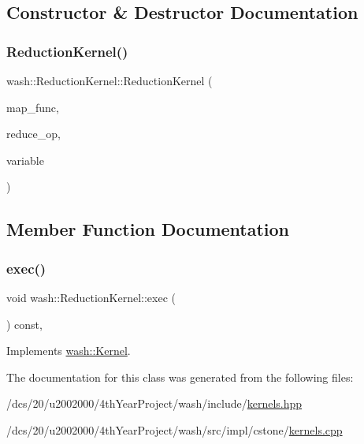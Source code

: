 \subsection{Constructor \& Destructor Documentation}
\mbox{\label{classwash_1_1ReductionKernel_a107edb65b63afdbc530718b5d3e901d6}} 
\subsubsection{\texorpdfstring{Reduction\+Kernel()}{ReductionKernel()}}
{\footnotesize\ttfamily wash\+::\+Reduction\+Kernel\+::\+Reduction\+Kernel (\begin{DoxyParamCaption}\item[{const \mbox{\hyperlink{namespacewash_ad515914307c88c01ff7524c57feabf83}{Map\+FuncT}}}]{map\+\_\+func,  }\item[{const \mbox{\hyperlink{namespacewash_a9c59e8c142d63d8640921c1b1957807e}{Reduce\+Op}}}]{reduce\+\_\+op,  }\item[{double $\ast$}]{variable }\end{DoxyParamCaption})\hspace{0.3cm}{\ttfamily [inline]}}



\subsection{Member Function Documentation}
\mbox{\label{classwash_1_1ReductionKernel_a3ead90df8748700f40b2e6820e8e7e91}} 
\subsubsection{\texorpdfstring{exec()}{exec()}}
{\footnotesize\ttfamily void wash\+::\+Reduction\+Kernel\+::exec (\begin{DoxyParamCaption}{ }\end{DoxyParamCaption}) const\hspace{0.3cm}{\ttfamily [override]}, {\ttfamily [virtual]}}



Implements \mbox{\hyperlink{classwash_1_1Kernel_a0ec211840402ce975997b22136f16e39}{wash\+::\+Kernel}}.



The documentation for this class was generated from the following files\+:\begin{DoxyCompactItemize}
\item 
/dcs/20/u2002000/4th\+Year\+Project/wash/include/\mbox{\hyperlink{kernels_8hpp}{kernels.\+hpp}}\item 
/dcs/20/u2002000/4th\+Year\+Project/wash/src/impl/cstone/\mbox{\hyperlink{cstone_2kernels_8cpp}{kernels.\+cpp}}\end{DoxyCompactItemize}
